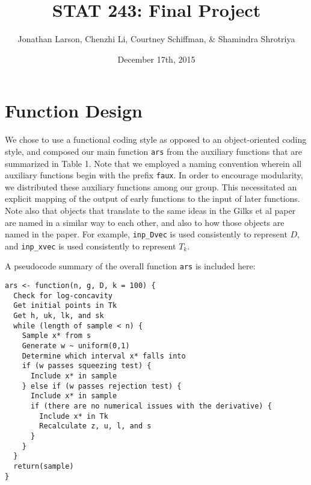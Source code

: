 \documentclass{article}\usepackage[]{graphicx}\usepackage[]{color}
\begin{document}
 
\title{STAT 243: Final Project}
\author{Jonathan Larson, Chenzhi Li, Courtney Schiffman, \& Shamindra Shrotriya}
\date{December 17th, 2015}

\maketitle

\section{Function Design}

We chose to use a functional coding style as opposed to an object-oriented coding style,
and composed our main function \texttt{ars} from the auxiliary functions
that are summarized in Table 1.
Note that we employed a naming convention wherein all auxiliary functions
begin with the prefix \texttt{faux}.
In order to encourage modularity, we distributed these auxiliary functions
among our group. This necessitated an explicit mapping of the output of early
functions to the input of later functions.
Note also that objects that translate to the same ideas in the Gilks et al paper are named
in a similar way to each other, and also to how those objects are named
in the paper. For example, \texttt{inp\_Dvec} is used consistently
to represent $D$, and \texttt{inp\_xvec} is used consistently to represent
$T_k$.

A pseudocode summary of the overall function \texttt{ars} is included here:
\begin{verbatim}
ars <- function(n, g, D, k = 100) {
  Check for log-concavity
  Get initial points in Tk
  Get h, uk, lk, and sk
  while (length of sample < n) {
    Sample x* from s
    Generate w ~ uniform(0,1)
    Determine which interval x* falls into
    if (w passes squeezing test) {
      Include x* in sample
    } else if (w passes rejection test) {
      Include x* in sample
      if (there are no numerical issues with the derivative) {
        Include x* in Tk
        Recalculate z, u, l, and s
      }
    }
  }
  return(sample)
}
\end{verbatim}
\end{document}
